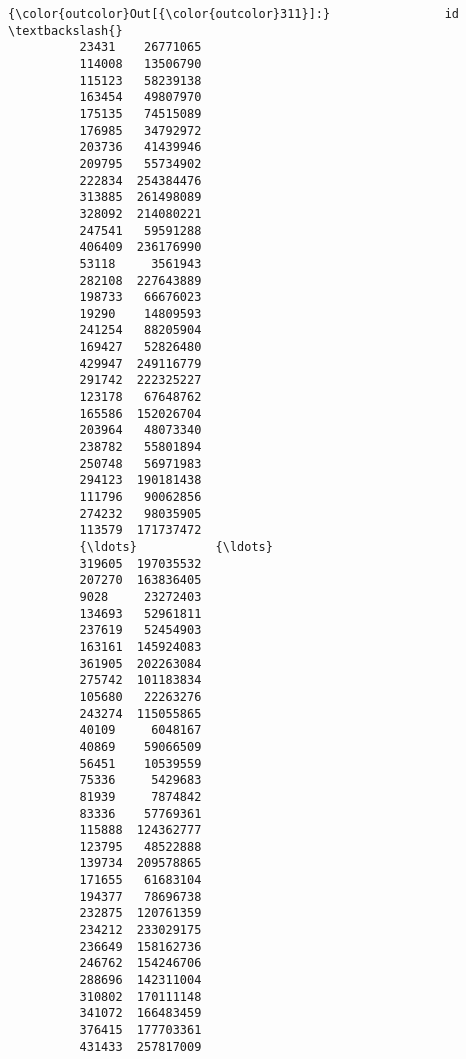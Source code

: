 \documentclass[11pt]{article}
\begin{document}
\begin{Verbatim}[commandchars=\\\{\}]
{\color{outcolor}Out[{\color{outcolor}311}]:}                id  \textbackslash{}
          23431    26771065   
          114008   13506790   
          115123   58239138   
          163454   49807970   
          175135   74515089   
          176985   34792972   
          203736   41439946   
          209795   55734902   
          222834  254384476   
          313885  261498089   
          328092  214080221   
          247541   59591288   
          406409  236176990   
          53118     3561943   
          282108  227643889   
          198733   66676023   
          19290    14809593   
          241254   88205904   
          169427   52826480   
          429947  249116779   
          291742  222325227   
          123178   67648762   
          165586  152026704   
          203964   48073340   
          238782   55801894   
          250748   56971983   
          294123  190181438   
          111796   90062856   
          274232   98035905   
          113579  171737472   
          {\ldots}           {\ldots}   
          319605  197035532   
          207270  163836405   
          9028     23272403   
          134693   52961811   
          237619   52454903   
          163161  145924083   
          361905  202263084   
          275742  101183834   
          105680   22263276   
          243274  115055865   
          40109     6048167   
          40869    59066509   
          56451    10539559   
          75336     5429683   
          81939     7874842   
          83336    57769361   
          115888  124362777   
          123795   48522888   
          139734  209578865   
          171655   61683104   
          194377   78696738   
          232875  120761359   
          234212  233029175   
          236649  158162736   
          246762  154246706   
          288696  142311004   
          310802  170111148   
          341072  166483459   
          376415  177703361   
          431433  257817009   
          

\end{Verbatim}
\end{document}
